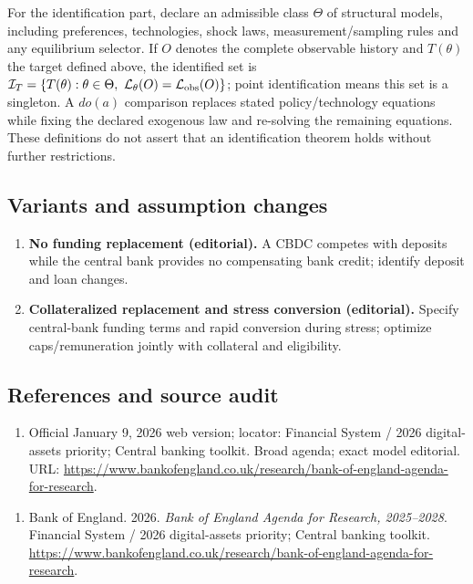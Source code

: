 \documentclass[11pt,a4paper]{article}
\begin{document}
For the identification part, declare an admissible class \(\Theta\) of structural models, including preferences, technologies, shock laws, measurement/sampling rules and any equilibrium selector. If \(O\) denotes the complete observable history and \(T(\theta)\) the target defined above, the identified set is \(\mathcal I_T=\{T(\theta):\theta\in\Theta,\ \mathcal L_\theta(O)=\mathcal L_{\rm obs}(O)\}\); point identification means this set is a singleton. A \(do(a)\) comparison replaces stated policy/technology equations while fixing the declared exogenous law and re-solving the remaining equations. These definitions do not assert that an identification theorem holds without further restrictions.
\subsection*{Variants and assumption changes}
\begin{enumerate}
\item \textbf{No funding replacement (editorial).} A CBDC competes with deposits while the central bank provides no compensating bank credit; identify deposit and loan changes.
\item \textbf{Collateralized replacement and stress conversion (editorial).} Specify central-bank funding terms and rapid conversion during stress; optimize caps/remuneration jointly with collateral and eligibility.
\end{enumerate}
\subsection*{References and source audit}
\begin{enumerate}
\item Official January 9, 2026 web version; locator: Financial System / 2026 digital-assets priority; Central banking toolkit. Broad agenda; exact model editorial. URL: \url{https://www.bankofengland.co.uk/research/bank-of-england-agenda-for-research}.
\end{enumerate}
\begin{enumerate}\raggedright
\item\hypertarget{definitions:source:30007611:1}{} Bank of England. 2026. \emph{Bank of England Agenda for Research, 2025–2028}. Financial System / 2026 digital-assets priority; Central banking toolkit.
\url{https://www.bankofengland.co.uk/research/bank-of-england-agenda-for-research}.
\end{enumerate}
\end{document}
